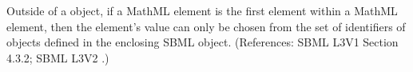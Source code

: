Outside of a \FunctionDefinition object, if a MathML  element is
the first element within a MathML  element, then the
 element's value can only be chosen from the set of identifiers
of \FunctionDefinition{} objects defined in the enclosing SBML \Model
object.  (References: SBML L3V1 Section 4.3.2; SBML L3V2
.)
